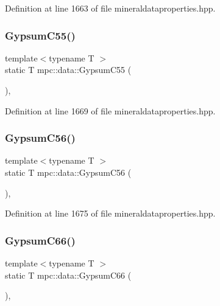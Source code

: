 Definition at line 1663 of file mineraldataproperties.\+hpp.

\mbox{\label{namespacempc_1_1data_aecb7459942150506e0f2bfa8455ce270}} 
\subsubsection{\texorpdfstring{Gypsum\+C55()}{GypsumC55()}}
{\footnotesize\ttfamily template$<$typename T $>$ \\
static T mpc\+::data\+::\+Gypsum\+C55 (\begin{DoxyParamCaption}{ }\end{DoxyParamCaption})\hspace{0.3cm}{\ttfamily [inline]}, {\ttfamily [static]}}



Definition at line 1669 of file mineraldataproperties.\+hpp.

\mbox{\label{namespacempc_1_1data_ae5ec0ac20cc68eea6e971adf0bc7f6c5}} 
\subsubsection{\texorpdfstring{Gypsum\+C56()}{GypsumC56()}}
{\footnotesize\ttfamily template$<$typename T $>$ \\
static T mpc\+::data\+::\+Gypsum\+C56 (\begin{DoxyParamCaption}{ }\end{DoxyParamCaption})\hspace{0.3cm}{\ttfamily [inline]}, {\ttfamily [static]}}



Definition at line 1675 of file mineraldataproperties.\+hpp.

\mbox{\label{namespacempc_1_1data_a62f9e55b7c7597ba3c377061e4cfd7da}} 
\subsubsection{\texorpdfstring{Gypsum\+C66()}{GypsumC66()}}
{\footnotesize\ttfamily template$<$typename T $>$ \\
static T mpc\+::data\+::\+Gypsum\+C66 (\begin{DoxyParamCaption}{ }\end{DoxyParamCaption})\hspace{0.3cm}{\ttfamily [inline]}, {\ttfamily [static]}}



